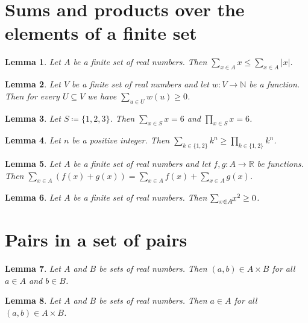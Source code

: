 \documentclass{article}
\newtheorem{lemma}{Lemma}
\begin{document}
\section{Sums and products over the elements of a finite set}

\begin{lemma}\label{triangle}
Let $A$ be a finite set of real numbers. Then $\sum_{x\in A}x\le\sum_{x\in A}|x|$.
\end{lemma}

\begin{lemma}\label{weights}
Let $V$ be a finite set of real numbers and let $w\colon V\to\mathbb{N}$ be a function. Then for every $U\subseteq V$ we have $\sum_{u\in U}w(u)\ge0$.
\end{lemma}

\begin{lemma}\label{six}
Let $S\coloneqq\{1,2,3\}$. Then $\sum_{x\in S}x=6$ and $\prod_{x\in S}x=6$.
\end{lemma}

\begin{lemma}\label{squares}
Let $n$ be a positive integer. Then $\sum_{k\in\{1,2\}}k^n\ge\prod_{k\in\{1,2\}}k^n$.
\end{lemma}

\begin{lemma}\label{additive}
Let $A$ be a finite set of real numbers and let $f,g\colon A\to\mathbb{R}$ be functions. Then $\sum_{x\in A}(f(x)+g(x))=\sum_{x\in A}f(x)+\sum_{x\in A}g(x)$.
\end{lemma}

\begin{lemma}\label{layout}
Let $A$ be a finite set of real numbers. Then $\sum_{x\in\mathrlap{A}}\ x^2\ge0$.
\end{lemma}

\section{Pairs in a set of pairs}

\begin{lemma}\label{product}
Let $A$ and $B$ be sets of real numbers. Then $(a,b)\in A\times B$ for all $a\in A$ and $b\in B$.
\end{lemma}

\begin{lemma}\label{components}
Let $A$ and $B$ be sets of real numbers. Then $a\in A$ for all $(a,b)\in A\times B$.
\end{lemma}
\end{document}
